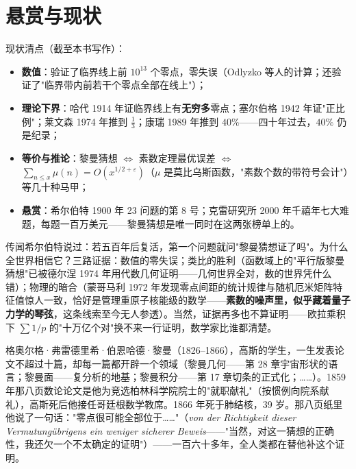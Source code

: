 \section{悬赏与现状}

现状清点（截至本书写作）：
\begin{itemize}
\item \textbf{数值}：验证了临界线上前 $10^{13}$ 个零点，零失误（Odlyzko 等人的计算；还验证了"临界带内前若干个零点全部在线上"）；
\item \textbf{理论下界}：哈代 1914 年证临界线上有\textbf{无穷多}零点；塞尔伯格 1942 年证"正比例"；莱文森 1974 年推到 $\tfrac13$；康瑞 1989 年推到 \textbf{$40\%$}——四十年过去，$40\%$ 仍是纪录；
\item \textbf{等价与推论}：黎曼猜想 $\iff$ 素数定理最优误差 $\iff$ $\sum_{n\le x}\mu(n) = O(x^{1/2+\varepsilon})$（$\mu$ 是莫比乌斯函数，"素数个数的带符号会计"）等几十种马甲；
\item \textbf{悬赏}：希尔伯特 1900 年 23 问题的第 8 号；克雷研究所 2000 年千禧年七大难题，每题一百万美元——黎曼猜想是唯一同时在这两张榜单上的。
\end{itemize}

传闻希尔伯特说过：若五百年后复活，第一个问题就问"黎曼猜想证了吗"。为什么全世界相信它？三路证据：数值的零失误；类比的胜利（函数域上的"平行版黎曼猜想"已被德尔涅 1974 年用代数几何证明——几何世界全对，数的世界凭什么错）；物理的暗合（蒙哥马利 1972 年发现零点间距的统计规律与随机厄米矩阵特征值惊人一致，恰好是管理重原子核能级的数学——\textbf{素数的噪声里，似乎藏着量子力学的琴弦}，这条线索至今无人参透）。当然，证据再多也不算证明——欧拉乘积下 $\sum 1/p$ 的"十万亿个对"换不来一行证明，数学家比谁都清楚。

\begin{lishi}
格奥尔格·弗雷德里希·伯恩哈德·黎曼（1826--1866），高斯的学生，一生发表论文不超过十篇，却每一篇都开辟一个领域（黎曼几何——第 28 章宇宙形状的语言；黎曼面——复分析的地基；黎曼积分——第 17 章切条的正式化；……）。1859 年那八页数论论文是他为竞选柏林科学院院士的"就职献礼"（按惯例向院系献礼），高斯死后他接任哥廷根数学教席。1866 年死于肺结核，39 岁。那八页纸里他说了一句话："零点很可能全部位于……"（\textit{von der Richtigkeit dieser Vermutung\"ubrigens ein weniger sicherer Beweis}——"当然，对这一猜想的正确性，我还欠一个不太确定的证明"）——一百六十多年，全人类都在替他补这个证明。
\end{lishi}

